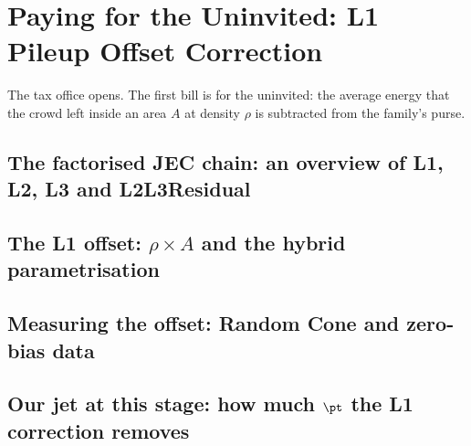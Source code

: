 \chapter{Paying for the Uninvited: L1 Pileup Offset Correction}
\label{ch:paying_for_uninvited}

\begin{journeybox}
The tax office opens. The first bill is for the uninvited: the average energy
that the crowd left inside an area $A$ at density $\rho$ is subtracted from the
family's purse.
\end{journeybox}


\section{The factorised JEC chain: an overview of L1, L2, L3 and L2L3Residual}
\label{sec:paying_for_uninvited:the_factorised_jec_chain_an_overview_of_}

\section{The L1 offset: $\rho\times A$ and the hybrid parametrisation}
\label{sec:paying_for_uninvited:the_l1_offset_rhotimes_a_and_the_hybrid_}

\section{Measuring the offset: Random Cone and zero-bias data}
\label{sec:paying_for_uninvited:measuring_the_offset_random_cone_and_zer}

\section{Our jet at this stage: how much $\pt$ the L1 correction removes}
\label{sec:paying_for_uninvited:our_jet_at_this_stage_how_much_pt_the_l1}

